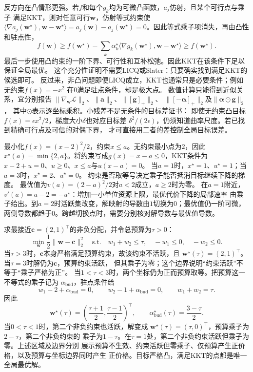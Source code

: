 反方向在凸情形更强。若$f$和每个$g_k$均为可微凸函数，$a_j$仿射，且某个可行点与乘子
满足KKT，则对任意可行$\bm{w}$，仿射等式约束使
$\langle\nabla a_j(\bm{w}^{\star}),\bm{w}-\bm{w}^{\star}\rangle
=a_j(\bm{w})-a_j(\bm{w}^{\star})=0$。因此等式乘子项消失，再由凸性和驻点性，
\[
  f(\bm{w})\geq
  f(\bm{w}^{\star})
  -\sum_k\alpha_k^{\star}
  \langle\nabla g_k(\bm{w}^{\star}),\bm{w}-\bm{w}^{\star}\rangle
  \geq f(\bm{w}^{\star}).
\]
最后一步使用凸约束的一阶下界、可行性和互补松弛。因此KKT在该条件下足以保证全局最优。
这个充分性证明不需要LICQ或Slater：只要确实找到满足KKT的候选即可。
反过来，非凸问题即便LICQ成立，KKT也通常只是必要条件；例如无约束$f(x)=-x^2$
在$0$满足驻点条件，却是极大点。
数值计算只能得到近似关系，宜分别报告
$\|\nabla_{\bm w}\mathcal L\|_2$、$\|\bm a\|_2$、$\|[\bm g]_+\|_2$、
$\|[-\bm\alpha]_+\|_2$及$\|\bm\alpha\odot\bm g\|_2$，
其中$\odot$表示逐坐标乘积。小残差不是无条件的目标差证书：
即使无约束凸目标$f(x)=\epsilon x^2/2$，梯度大小$\delta$也对应目标差
$\delta^2/(2\epsilon)$，仍须知道曲率尺度。若已找到精确可行点及可信的对偶下界，
才可直接用二者的差控制全局目标误差。

\begin{example}[活跃约束与乘子]
\label{ex:opt-scalar-active-constraint}
最小化$f(x)=(x-2)^2/2$，约束$x\leq a$。无约束最小点为$2$，因此
$x^\star(a)=\min\{2,a\}$。将约束写成$g(x)=x-a\leq0$，KKT条件为
$x-2+u=0$、$u\geq0$、$x\leq a$与$u(x-a)=0$。
当$a=1$时，$x^\star=1$、$u^\star=1$；当$a=3$时，$x^\star=2$、$u^\star=0$。
约束是否取等号决定乘子能否抵消目标继续下降的梯度。
最优值为$v(a)=(2-a)^2/2$对$a<2$成立，$a\geq2$时为零。
在$a=1$附近，$v'(a)=a-2=-u^\star$：增加一小单位资源上限，最优代价下降的局部速率
由乘子给出。到$a=2$时活跃集改变，解映射的导数由$1$切换为$0$；最优值仍一阶可微，两侧导数都趋于$0$。跨越切换点时，需要分别核对解导数与最优值导数。
\end{example}

\begin{example}
\label{ex:opt-kkt-budget}
求最接近$\bm{c}=(2,1)^{\top}$的非负分配，并令总预算为$\tau>0$：
\[
  \min_{\bm{w}}\frac12\lVert\bm{w}-\bm{c}\rVert_2^2
  \quad\text{s.t.}\quad
  w_1+w_2\leq\tau,\quad -w_1\leq0,\quad -w_2\leq0.
\]
当$\tau>3$时，$\bm{c}$本身严格满足预算约束，故该约束不活跃，且
$\bm{w}^{\star}(\tau)=(2,1)^{\top}$。当$\tau=3$时解仍为$\bm{c}$，预算约束活跃，
但其乘子为零；这个边界说明“约束活跃”不等于“乘子严格为正”。
当$1<\tau<3$时，两个坐标仍为正而预算取等。把预算这一不等式的乘子记为
$\alpha_{\mathrm{bud}}$，驻点条件给
\[
  w_1-2+\alpha_{\mathrm{bud}}=0,\qquad
  w_2-1+\alpha_{\mathrm{bud}}=0,\qquad
  w_1+w_2=\tau.
\]
因此
\[
  \bm{w}^{\star}(\tau)
  =\left(\frac{\tau+1}{2},\frac{\tau-1}{2}\right)^{\top},
  \qquad
  \alpha_{\mathrm{bud}}^{\star}(\tau)=\frac{3-\tau}{2}.
\]
当$0<\tau<1$时，第二个非负约束也活跃，解变成
$\bm{w}^{\star}(\tau)=(\tau,0)^{\top}$，预算乘子为$2-\tau$，第二个非负约束的
乘子为$1-\tau$。在$\tau=1$处，第二个非负约束活跃但乘子为零。上述区域及边界分别
展示预算不生效、约束活跃但零乘子、仅预算产生正价格，以及预算与坐标边界同时产生
正价格。目标严格凸，满足KKT的点都是唯一全局最优解。
\end{example}

